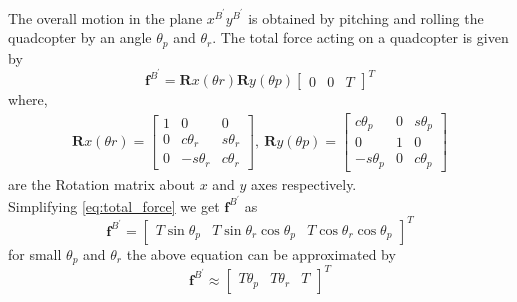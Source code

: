 \documentclass[letterpaper, 10 pt, conference]{ieeeconf}
\begin{document}

The overall motion in the plane $x^{B^{\prime}}y^{B^{\prime}}$ is obtained by pitching and rolling the quadcopter by an angle $\theta_{p}$ and $\theta_{r}$. The total force acting on a quadcopter is given by
\begin{equation}
    \mathbf{f}^{B^{\prime}}=\mathbf{R}{x}\left(\theta{r}\right) \mathbf{R}{y}\left(\theta{p}\right)\begin{bmatrix}
        0 & 0 & T
    \end{bmatrix}^{T}\label{eq:total_force}
\end{equation}
where,
\begin{align*}
    \mathbf{R}{x}\left(\theta{r}\right)=\begin{bmatrix}
        1 & 0             & 0            \\
        0 & c \theta_{r}  & s \theta_{r} \\
        0 & -s \theta_{r} & c \theta_{r}
    \end{bmatrix},
    ~
    \mathbf{R}{y}\left(\theta{p}\right)=\begin{bmatrix}
        c \theta_{p}  & 0 & s \theta_{p} \\
        0             & 1 & 0            \\
        -s \theta_{p} & 0 & c \theta_{p}
    \end{bmatrix}
\end{align*}
are the Rotation matrix about $x$ and $y$ axes respectively.\\
Simplifying \eqref{eq:total_force} we get $\mathbf{f}^{B^{\prime}}$ as
\begin{equation*}
    \mathbf{f}^{B^{\prime}}=\begin{bmatrix}
        T\sin{\theta_{p}} & T\sin{\theta_{r}}\cos{\theta_{p}} & T\cos{\theta_{r}}\cos{\theta_{p}}
    \end{bmatrix}^{T}
\end{equation*}
for small $\theta_{p}$ and $\theta_{r}$ the above equation can be approximated by
\begin{equation*}
    \mathbf{f}^{B^{\prime}} \approx \begin{bmatrix}
        T\theta_{p} & T\theta_{r} & T
    \end{bmatrix}^{T}
\end{equation*}
\end{document}
